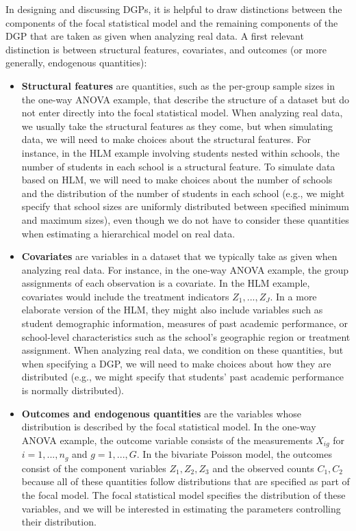 \documentclass[
]{book}
\providecommand{\tightlist}{%
  \setlength{\itemsep}{0pt}\setlength{\parskip}{0pt}}
\begin{document}
In designing and discussing DGPs, it is helpful to draw distinctions between the components of the focal statistical model and the remaining components of the DGP that are taken as given when analyzing real data. A first relevant distinction is between structural features, covariates, and outcomes (or more generally, endogenous quantities):

\begin{itemize}
\tightlist
\item
  \textbf{Structural features} are quantities, such as the per-group sample sizes in the one-way ANOVA example, that describe the structure of a dataset but do not enter directly into the focal statistical model.
  When analyzing real data, we usually take the structural features as they come, but when simulating data, we will need to make choices about the structural features.
  For instance, in the HLM example involving students nested within schools, the number of students in each school is a structural feature.
  To simulate data based on HLM, we will need to make choices about the number of schools and the distribution of the number of students in each school (e.g., we might specify that school sizes are uniformly distributed between specified minimum and maximum sizes), even though we do not have to consider these quantities when estimating a hierarchical model on real data.
\item
  \textbf{Covariates} are variables in a dataset that we typically take as given when analyzing real data.
  For instance, in the one-way ANOVA example, the group assignments of each observation is a covariate.
  In the HLM example, covariates would include the treatment indicators \(Z_1,...,Z_J\). In a more elaborate version of the HLM, they might also include variables such as student demographic information, measures of past academic performance, or school-level characteristics such as the school's geographic region or treatment assignment.
  When analyzing real data, we condition on these quantities, but when specifying a DGP, we will need to make choices about how they are distributed (e.g., we might specify that students' past academic performance is normally distributed).
\item
  \textbf{Outcomes and endogenous quantities} are the variables whose distribution is described by the focal statistical model.
  In the one-way ANOVA example, the outcome variable consists of the measurements \(X_{ig}\) for \(i = 1,...,n_g\) and \(g = 1,...,G\).
  In the bivariate Poisson model, the outcomes consist of the component variables \(Z_1,Z_2,Z_3\) and the observed counts \(C_1,C_2\) because all of these quantities follow distributions that are specified as part of the focal model.
  The focal statistical model specifies the distribution of these variables, and we will be interested in estimating the parameters controlling their distribution.
\end{itemize}
\end{document}
